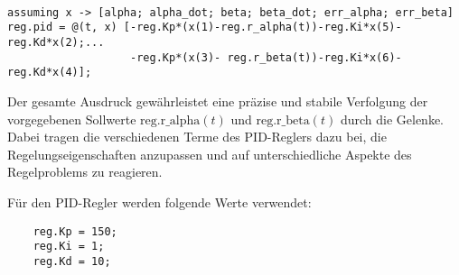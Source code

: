 \begin{verbatim}

assuming x -> [alpha; alpha_dot; beta; beta_dot; err_alpha; err_beta]
reg.pid = @(t, x) [-reg.Kp*(x(1)-reg.r_alpha(t))-reg.Ki*x(5)-reg.Kd*x(2);...
                   -reg.Kp*(x(3)- reg.r_beta(t))-reg.Ki*x(6)-reg.Kd*x(4)];
\end{verbatim}


Der gesamte Ausdruck gewährleistet eine präzise und stabile Verfolgung der vorgegebenen Sollwerte \( \text{reg.r\_alpha}(t) \) und \( \text{reg.r\_beta}(t) \) durch die Gelenke. Dabei tragen die verschiedenen Terme des PID-Reglers dazu bei, die Regelungseigenschaften anzupassen und auf unterschiedliche Aspekte des Regelproblems zu reagieren.

Für den PID-Regler werden folgende Werte verwendet:
\begin{verbatim}
    reg.Kp = 150;
    reg.Ki = 1;
    reg.Kd = 10;
\end{verbatim}